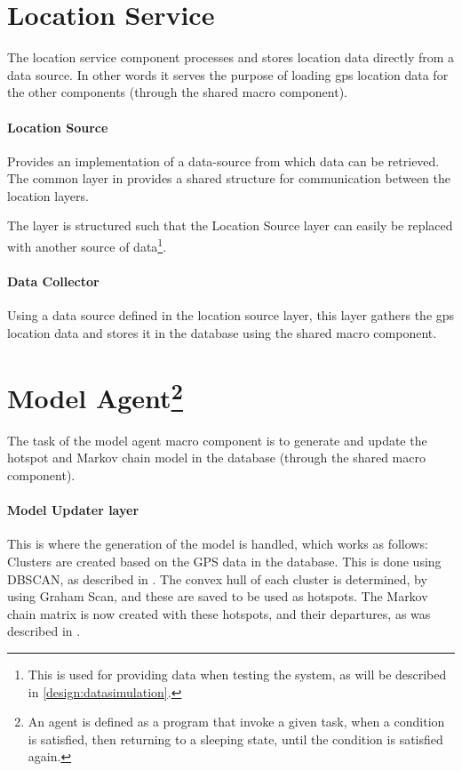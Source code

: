 \section{Location Service} 
The location service component processes and stores location data directly from a data source.
In other words it serves the purpose of loading gps location data for the other components (through the shared macro component).

\paragraph{Location Source} Provides an implementation of a data-source from which data can be retrieved.
The common layer in provides a shared structure for communication between the location layers.

The layer is structured such that the Location Source layer can easily be replaced with another source of data\footnote{This is used for providing data when testing the system, as will be described in \cref{design:datasimulation}.}.

\paragraph{Data Collector} Using a data source defined in the location source layer, this layer gathers the gps location data and stores it in the database using the shared macro component.

\section[title]{Model Agent\footnote{An agent is defined as a program that invoke a given task, when a condition is satisfied, then returning to a sleeping state, until the condition is satisfied again.\cite{definitionagent}}}
The task of the model agent macro component is to generate and update the hotspot and Markov chain model in the database (through the shared macro component).

\paragraph{Model Updater layer} This is where the generation of the model is handled, which works as follows:\\
Clusters are created based on the GPS data in the database.
This is done using DBSCAN, as described in .
The convex hull of each cluster is determined, by using Graham Scan, and these are saved to be used as hotspots.
The Markov chain matrix is now created with these hotspots, and their departures, as was described in .

